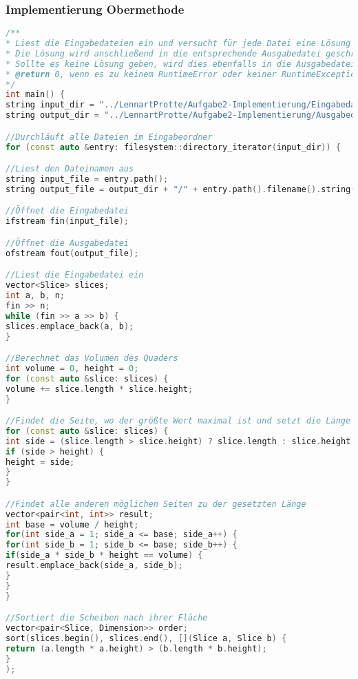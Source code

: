 \documentclass[a4paper,10pt,ngerman]{scrartcl}
\begin{document}
    \subsubsection{Implementierung Obermethode}
    \begin{lstlisting}[frame=single,language=C++,title=Methode main,breaklines=true,label={lst:code_main}]
/**
* Liest die Eingabedateien ein und versucht für jede Datei eine Lösung entsprechend der Aufgabenstellung zu finden
* Die Lösung wird anschließend in die entsprechende Ausgabedatei geschrieben
* Sollte es keine Lösung geben, wird dies ebenfalls in die Ausgabedatei geschrieben
* @return 0, wenn es zu keinem RuntimeError oder keiner RuntimeException gekommen ist
*/
int main() {
string input_dir = "../LennartProtte/Aufgabe2-Implementierung/Eingabedateien";
string output_dir = "../LennartProtte/Aufgabe2-Implementierung/Ausgabedateien";

//Durchläuft alle Dateien im Eingabeordner
for (const auto &entry: filesystem::directory_iterator(input_dir)) {

//Liest den Dateinamen aus
string input_file = entry.path();
string output_file = output_dir + "/" + entry.path().filename().string();

//Öffnet die Eingabedatei
ifstream fin(input_file);

//Öffnet die Ausgabedatei
ofstream fout(output_file);

//Liest die Eingabedatei ein
vector<Slice> slices;
int a, b, n;
fin >> n;
while (fin >> a >> b) {
slices.emplace_back(a, b);
}

//Berechnet das Volumen des Quaders
int volume = 0, height = 0;
for (const auto &slice: slices) {
volume += slice.length * slice.height;
}

//Findet die Seite, wo der größte Wert maximal ist und setzt die Länge auf diesen Wert
for (const auto &slice: slices) {
int side = (slice.length > slice.height) ? slice.length : slice.height;
if (side > height) {
height = side;
}
}

//Findet alle anderen möglichen Seiten zu der gesetzten Länge
vector<pair<int, int>> result;
int base = volume / height;
for(int side_a = 1; side_a <= base; side_a++) {
for(int side_b = 1; side_b <= base; side_b++) {
if(side_a * side_b * height == volume) {
result.emplace_back(side_a, side_b);
}
}
}

//Sortiert die Scheiben nach ihrer Fläche
vector<pair<Slice, Dimension>> order;
sort(slices.begin(), slices.end(), [](Slice a, Slice b) {
return (a.length * a.height) > (b.length * b.height);
}
);


\end{lstlisting}
\end{document}
